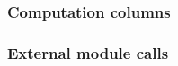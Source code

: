\subsubsection{Computation columns}           \label{mxp: columns: scenario: columns}            
\subsubsection{External module calls}         \label{mxp: columns: computations: module calls}   
